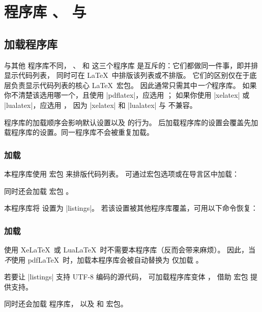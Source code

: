 \clearpage
\section{程序库
  、
   与
  }\label{sec:listings}%
%

\subsection{加载程序库}
与其他  程序库不同，
、 和  这三个程序库
是互斥的：它们都做同一件事，即并排显示代码列表，
同时可在 \LaTeX\ 中排版该列表或不排版。
它们的区别仅在于底层负责显示代码列表的核心 \LaTeX\ 宏包。
因此通常只需其中\emph{一个}程序库。
如果你不清楚该选用哪一个，且使用 |pdflatex|，应选用 ；
如果你使用 |xelatex| 或 |lualatex|，应选用 ，
因为 |xelatex| 和 |lualatex| 与  不兼容。

\begin{marker}
程序库的加载顺序会影响默认设置以及  的行为。
后加载程序库的设置会覆盖先加载程序库的设置。同一程序库不会被重复加载。
\end{marker}


\subsubsection{加载 }
本程序库使用  宏包 \cite{hoffmann:listings} 来排版代码列表。
可通过宏包选项或在导言区中加载：
\begin{dispListing}
\end{dispListing}
同时还会加载  宏包 \cite{hoffmann:listings}。

本程序库将  设置为 |listings|。
若该设置被其他程序库覆盖，可用以下命令恢复：
\begin{dispListing}
\end{dispListing}

\subsubsection{加载 }
\begin{marker}
使用 Xe\LaTeX\ 或 Lua\LaTeX\ 时不需要本程序库（反而会带来麻烦）。
因此，当\emph{不}使用 pdf\LaTeX\ 时，加载本程序库会被自动替换为
仅加载 。
\end{marker}
若要让 |listings| 支持 UTF-8 编码的源代码，
可加载程序库变体 ，
借助  宏包 \cite{oberdiek:listingsutf8} 提供支持。
\begin{dispListing}
\end{dispListing}
同时还会加载  程序库，
以及  \cite{hoffmann:listings} 和
 \cite{oberdiek:listingsutf8} 宏包。

